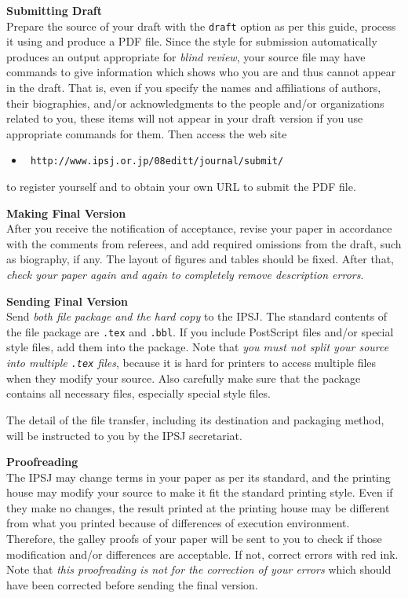 \documentclass[english]{ipsjpapers}
\def\|{\verb|}
\def\LaTeX{\leavevmode\smash{\iLATEX{\sc a}}}
\def\iLATEX#1{L\kern-.36em\raise.3ex\hbox{#1}\kern-.15em
    T\kern-.1667em\lower.7ex\hbox{E}\kern-.125emX}
\begin{document}
\begin{Enumerate}
\item {\bf Submitting Draft}\\
Prepare the {\LaTeX} source of your draft with the \|draft| option as per
this guide, process it using {\LaTeX} and produce a PDF file.  Since
the style for submission automatically produces an output appropriate for
{\em blind review}, your source file may have commands to give
information which shows who you are and thus cannot appear in the draft.
That is, even if you specify the names and affiliations of authors, their
biographies, and/or acknowledgments to the people and/or organizations
related to you, these items will not appear in your draft version if you use
appropriate commands for them.
Then access the web site
\begin{itemize}\item[]\tt
http://www.ipsj.or.jp/08editt/journal/submit/
\end{itemize}
to register
yourself and to obtain your own URL to submit the PDF file.

\item {\bf Making Final Version}\\
After you receive the notification of acceptance, revise your paper
in accordance with
the comments from referees, and add required omissions from
the draft, such as biography, if any.  The layout of figures and tables
should be fixed.  After that, {\em check your paper again and again to
completely remove description errors}.

\item {\bf Sending Final Version}\\
Send {\em both {\LaTeX} file package and the hard copy} to the IPSJ\@.  The
standard contents of the file package are \|.tex| and \|.bbl|.  If you
include PostScript files and/or special style files, add them into the
package.  Note that {\em you must not split your source into multiple
\|.tex| files}, because it is hard for printers to access multiple files
when they modify your source.  Also carefully make sure that the package
contains all necessary files, especially special style files.

The detail of the file transfer, including its destination and packaging
method, will be instructed to you by the IPSJ secretariat.

\item {\bf Proofreading}\\
The IPSJ may change terms in your paper as per its standard, and the printing
house may modify your source to make it fit the standard printing style.  Even
if they make no changes, the result printed at the printing house may be
different from what you printed because of differences of {\LaTeX}
execution environment.  Therefore, the galley proofs of your paper will be
sent to you to check if those modification and/or differences are
acceptable.  If not, correct errors with red ink.  Note that {\em this
proofreading is not for the correction of your errors} which should have been
corrected before sending the final version.


\end{Enumerate}
\end{document}
